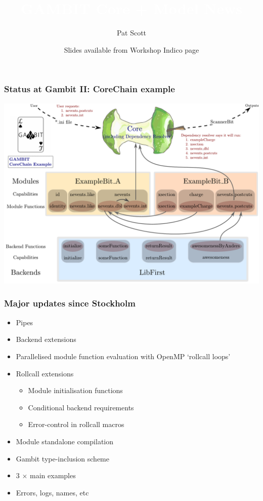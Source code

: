 \documentclass[xcolor=dvipsnames]{beamer}
\title[{\textcolor{white}GAMBIT Core + Model News}]{\textcolor{white}{GAMBIT Core + Model News}}
\author[\textcolor{medgrey}{Pat Scott -- Mar 24 -- GAMBIT III, Adelaide}]{Pat Scott}
\institute{\small{McGill/Imperial}}
\date[Oct 8 2012]{Slides available from Workshop Indico page}
\begin{document}
\begin{frame}
  \titlepage
\end{frame}


\begin{frame}
\frametitle{Status at Gambit II: CoreChain example}
\includegraphics[width=\linewidth]{coreChainDiagram_example_wlogo}
\end{frame}


\begin{frame}
\frametitle{Major updates since Stockholm}

\begin{itemize}

\item Pipes
\item Backend extensions
\item Parallelised module function evaluation with OpenMP `rollcall loops' 
\item Rollcall extensions
\begin{itemize}
  \item Module initialisation functions
  \item Conditional backend requirements
  \item Error-control in rollcall macros 
\end{itemize}
\item Module standalone compilation 
\item Gambit type-inclusion scheme
\item 3 $\times$ main examples
\item Errors, logs, names, etc

\end{itemize}


\end{frame}
\end{document}
